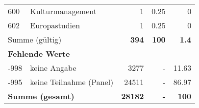 \begin{longtable}{lXrrr}
        600 & \multicolumn{1}{X}{Kulturmanagement} & %
          \num{1} &
          \num[round-mode=places,round-precision=2]{0.25} &
          \num[round-mode=places,round-precision=2]{0} \\

        602 & \multicolumn{1}{X}{Europastudien} & %
          \num{1} &
          \num[round-mode=places,round-precision=2]{0.25} &
          \num[round-mode=places,round-precision=2]{0} \\

     \midrule
     \multicolumn{2}{l}{Summe (gültig)} &
       \textbf{\num{394}} &
     \textbf{\num{100}} &
       \textbf{\num[round-mode=places,round-precision=2]{1.4}} \\
     \multicolumn{5}{l}{\textbf{Fehlende Werte}}\\
       -998 &
       keine Angabe &
         \num{3277} &
        - &
         \num[round-mode=places,round-precision=2]{11.63} \\
       -995 &
       keine Teilnahme (Panel) &
         \num{24511} &
        - &
         \num[round-mode=places,round-precision=2]{86.97} \\
     \midrule
     \multicolumn{2}{l}{\textbf{Summe (gesamt)}} &
          \textbf{\num{28182}} &
        \textbf{-} &
        \textbf{\num{100}} \\
     \bottomrule
     \end{longtable}
     
